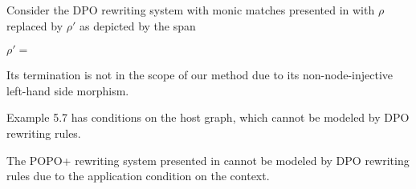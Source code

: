 \begin{example}
  \label{ex:overbeek_5d6_bis} 
  Consider the DPO rewriting system with monic matches presented in \cite[Example 5.6]{Overbeek2024subgraph} with $\rho$ replaced by $\rho'$ as depicted by the span 
  \begin{center}
    $\rho' = $\scalebox{0.9} { }
  \end{center}

  Its termination is not in the scope of our method due to its non-node-injective left-hand side morphism. 
\end{example}

\begin{example}
  Example 5.7 has conditions on the host graph, which cannot be modeled by DPO rewriting rules. 
\end{example}
\begin{example}
  The POPO+ rewriting system presented in \cite[Example 5.7]{Overbeek2024subgraph} cannot be modeled by DPO rewriting rules due to the application condition on the context.


\end{example}



